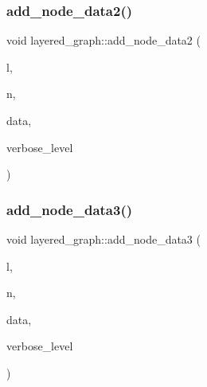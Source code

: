 \subsubsection{\texorpdfstring{add\+\_\+node\+\_\+data2()}{add\_node\_data2()}}
{\footnotesize\ttfamily void layered\+\_\+graph\+::add\+\_\+node\+\_\+data2 (\begin{DoxyParamCaption}\item[{\mbox{\hyperlink{galois_8h_a09fddde158a3a20bd2dcadb609de11dc}{I\+NT}}}]{l,  }\item[{\mbox{\hyperlink{galois_8h_a09fddde158a3a20bd2dcadb609de11dc}{I\+NT}}}]{n,  }\item[{\mbox{\hyperlink{galois_8h_a09fddde158a3a20bd2dcadb609de11dc}{I\+NT}}}]{data,  }\item[{\mbox{\hyperlink{galois_8h_a09fddde158a3a20bd2dcadb609de11dc}{I\+NT}}}]{verbose\+\_\+level }\end{DoxyParamCaption})}

\mbox{\label{classlayered__graph_af41e17810ce0e037178e859be7a45fda}} 
\subsubsection{\texorpdfstring{add\+\_\+node\+\_\+data3()}{add\_node\_data3()}}
{\footnotesize\ttfamily void layered\+\_\+graph\+::add\+\_\+node\+\_\+data3 (\begin{DoxyParamCaption}\item[{\mbox{\hyperlink{galois_8h_a09fddde158a3a20bd2dcadb609de11dc}{I\+NT}}}]{l,  }\item[{\mbox{\hyperlink{galois_8h_a09fddde158a3a20bd2dcadb609de11dc}{I\+NT}}}]{n,  }\item[{\mbox{\hyperlink{galois_8h_a09fddde158a3a20bd2dcadb609de11dc}{I\+NT}}}]{data,  }\item[{\mbox{\hyperlink{galois_8h_a09fddde158a3a20bd2dcadb609de11dc}{I\+NT}}}]{verbose\+\_\+level }\end{DoxyParamCaption})}

\mbox{\label{classlayered__graph_a0d91c07f86a005655748c99cff1b895f}} 
